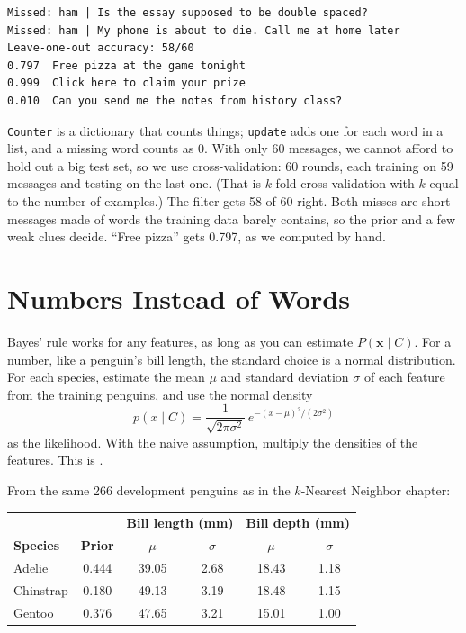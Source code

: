 \begin{verbatim}
Missed: ham | Is the essay supposed to be double spaced?
Missed: ham | My phone is about to die. Call me at home later
Leave-one-out accuracy: 58/60
0.797  Free pizza at the game tonight
0.999  Click here to claim your prize
0.010  Can you send me the notes from history class?
\end{verbatim}

\verb|Counter| is a dictionary that counts things; \verb|update| adds one for each word in a list, and a missing
word counts as 0. With only 60 messages, we cannot afford to hold out a big test set, so we use
 cross-validation: 60 rounds, each training on 59
messages and testing on the last one. (That is $k$-fold cross-validation with $k$ equal to the number of
examples.) The filter gets 58 of 60 right. Both misses are short messages made of words the training data barely
contains, so the prior and a few weak clues decide. ``Free pizza'' gets 0.797, as we computed by hand.

\section{Numbers Instead of Words}
Bayes' rule works for any features, as long as you can estimate $P(\mathbf{x} \mid C)$. For a number, like a
penguin's bill length, the standard choice is a normal distribution. For each species, estimate the mean
$\mu$ and standard deviation $\sigma$ of each feature from the training penguins, and use the normal density
$$p(x \mid C) = \frac{1}{\sqrt{2\pi\sigma^2}}\, e^{-(x - \mu)^2 / (2\sigma^2)}$$
as the likelihood. With the naive assumption, multiply the densities of the features. This is .

From the same 266 development penguins as in the $k$-Nearest Neighbor chapter:

\begin{center}
\begin{tabular}{l c c c c c}
 & & \multicolumn{2}{c}{\textbf{Bill length (mm)}} & \multicolumn{2}{c}{\textbf{Bill depth (mm)}} \\
\textbf{Species} & \textbf{Prior} & $\mu$ & $\sigma$ & $\mu$ & $\sigma$ \\
\hline
Adelie & 0.444 & 39.05 & 2.68 & 18.43 & 1.18 \\
Chinstrap & 0.180 & 49.13 & 3.19 & 18.48 & 1.15 \\
Gentoo & 0.376 & 47.65 & 3.21 & 15.01 & 1.00 \\
\end{tabular}
\end{center}

